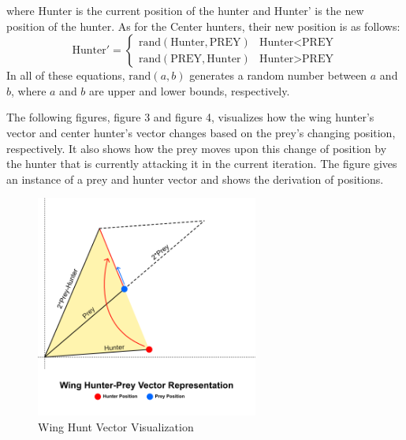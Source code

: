 where Hunter is the current position of the hunter and Hunter' is the new position of the hunter.
As for the Center hunters, their new position is as follows:
\[ \text{Hunter}' =  \begin{cases}
      \text{rand}(\text{Hunter}, \text{PREY}) & \text{Hunter} < \text{PREY} \\
      \text{rand}(\text{PREY}, \text{Hunter}) & \text{Hunter} > \text{PREY}
   \end{cases}
\]
In all of these equations, $\text{rand}(a,b)$ generates a random number between $a$ and $b$, where $a$ and $b$ are upper and lower bounds, respectively.

The following figures, figure 3 and figure 4, visualizes how the wing hunter's vector and center hunter's vector changes based on the prey's changing position, respectively. It also shows how the prey moves upon this change of position by the hunter that is currently attacking it in the current iteration. The figure gives an instance of a prey and hunter vector and shows the derivation of positions.

\begin{figure}[h]
\begin{center}
\includegraphics[width=0.65\textwidth]{img/pa/wing-hunt}
\caption{Wing Hunt Vector Visualization}
\end{center}
\end{figure}

